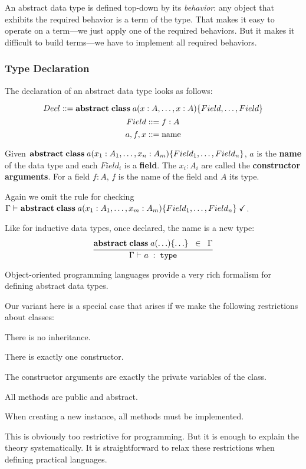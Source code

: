 An abstract data type is defined top-down by its \emph{behavior}: any object that exhibits the required behavior is a term of the type.
That makes it easy to operate on a term---we just apply one of the required behaviors.
But it makes it difficult to build terms---we have to implement all required behaviors.

\subsubsection{Type Declaration}

The declaration of an abstract data type looks as follows:

\[Decl \bbc \aclassAI{a}{x:A,\ldots,x:A}{}{Field,\ldots,Field}\]
\[Field ::= f:A\]
\[a,f,x ::= \text{name} \]

Given $\aclassAI{a}{x_1:A_1,\ldots,x_n:A_m}{}{Field_1,\ldots,Field_n}$, $a$ is the \textbf{name} of the data type and each $Field_i$ is a \textbf{field}.
The $x_i:A_i$ are called the \textbf{constructor arguments}.
For a field $f:A$, $f$ is the name of the field and $A$ its type.

Again we omit the rule for checking $\isdecl{}{\Gamma}{\aclassAI{a}{x_1:A_1,\ldots,x_m:A_m}{}{Field_1,\ldots,Field_n}}$.

Like for inductive data types, once declared, the name is a new type:
\[\rul{\aclassAI{a}{\ldots}{}{\ldots}\;\;\in\;\;\Gamma}{\oftype{}{\Gamma}{a}{\type}}\]

\begin{remark}
Object-oriented programming languages provide a very rich formalism for defining abstract data types.

Our variant here is a special case that arises if we make the following restrictions about classes:
\begin{compactitem}
 \item There is no inheritance.
 \item There is exactly one constructor.
 \item The constructor arguments are exactly the private variables of the class.
 \item All methods are public and abstract.
 \item When creating a new instance, all methods must be implemented.
\end{compactitem}
This is obviously too restrictive for programming.
But it is enough to explain the theory systematically.
It is straightforward to relax these restrictions when defining practical languages.
\end{remark}

